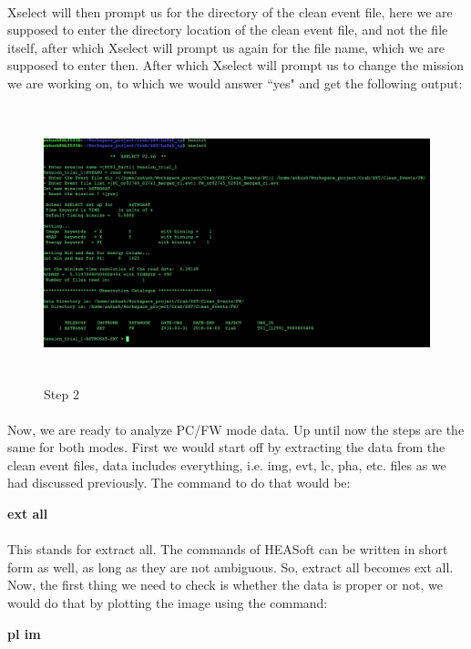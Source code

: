 \documentclass[a4paper,twoside]{report}
\numberwithin{equation}{section}
\begin{document}
\paragraph{}
Xselect will then prompt us for the directory of the clean event file, here we are supposed to enter the directory location of the clean event file, and not the file itself, after which Xselect will prompt us again for the file name, which we are supposed to enter then. After which Xselect will prompt us to change the mission we are working on, to which we would answer ``yes" and get the following output:
\begin{figure}[h]
\includegraphics[width=1.0\linewidth, height=8cm]{Step_2.jpg}
\caption{Step 2}
\label{step_2}
\end{figure}
\paragraph{}
Now, we are ready to analyze PC/FW mode data. Up until now the steps are the same for both modes. First we would start off by extracting the data from the clean event files, data includes everything, i.e. img, evt, lc, pha, etc. files as we had discussed previously. The command to do that would be:
\begin{center}
\item \large \textbf {ext all}
\end{center}
\paragraph{}
This stands for extract all. The commands of HEASoft can be written in short form as well, as long as they are not ambiguous. So, extract all becomes ext all. Now, the first thing we need to check is whether the data is proper or not, we would do that by plotting the image using the command:
\begin{center}
\item \large \textbf {pl im}
\end{center}
\end{document}

